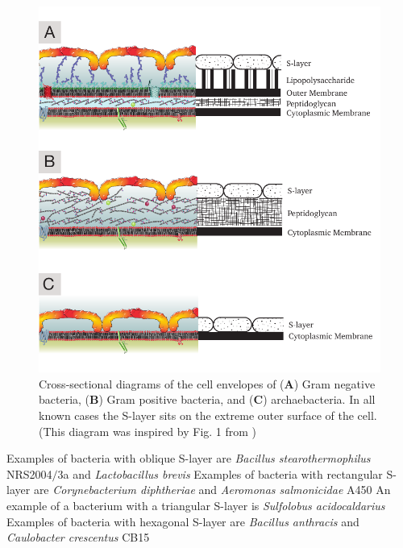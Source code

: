         \begin{figure}[p] %
                \begin{center}
                    \includegraphics{intro/img/celwalls.pdf}
                \end{center}
                \caption[Cross-sectional diagrams of \ac{S-layer} containing cell envelopes]{Cross-sectional diagrams of the cell envelopes of (\textbf{A}) Gram negative bacteria, (\textbf{B}) Gram positive bacteria, and (\textbf{C}) archaebacteria. In all known cases the \ac{S-layer} sits on the extreme outer surface of the cell. (This diagram was inspired by Fig. 1 from )}
            \label{fig:cellwalls}
        \end{figure}

            Examples of bacteria with oblique \acs{S-layer} are \textit{Bacillus stearothermophilus} NRS2004$/$3a and \textit{Lactobacillus brevis}
            Examples of bacteria with rectangular \acs{S-layer} are \textit{Corynebacterium diphtheriae} and \textit{Aeromonas salmonicidae} A450
            An example of a bacterium with a triangular \ac{S-layer} is \textit{Sulfolobus acidocaldarius}
            Examples of bacteria with hexagonal \acs{S-layer} are \textit{Bacillus anthracis} and \textit{Caulobacter crescentus} CB15

